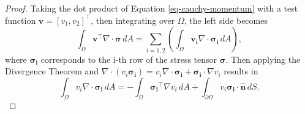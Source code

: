 \documentclass[5pt,a4paper,english]{elsarticle}%
\begin{document}
\begin{proof}
Taking the dot product of  Equation \eqref{eq-cauchy-momentum} with a test function $\boldsymbol{v} = [v_1, v_2]^\intercal$, then integrating over $\Omega$, the left side becomes
\begin{equation} \label{eq-cauchy-expand}
    \int_\Omega{\boldsymbol{v}^\intercal \nabla \cdot \boldsymbol{\sigma}} \,dA = \sum_{i = 1,2}\left(\int_\Omega{\boldsymbol{v_i} \nabla \cdot \boldsymbol{\sigma_i}} \,dA \right),
\end{equation}
where $\boldsymbol{\sigma_i}$ corresponds to the i-th row of the stress tensor $\boldsymbol{\sigma}$. 
Then applying the Divergence Theorem and $\nabla \cdot (v_i \boldsymbol{\sigma_i})  = v_i \nabla \cdot \boldsymbol{\sigma_i} + \boldsymbol{\sigma_i} \cdot \nabla v_i$ results in 
\begin{equation} \label{eq-div-theorem-to-Cauchy-momentum}
    \int_\Omega{{v_i} \nabla \cdot \boldsymbol{\sigma_i}}  \,dA = -\int_\Omega{\boldsymbol{\sigma_i}^\intercal \nabla v_i}  \,dA +  \int_{\partial \Omega}{v_i \boldsymbol{\sigma_i} \cdot \boldsymbol{\hat{n}} }  \,dS.
\end{equation}


\end{proof}
\end{document}
